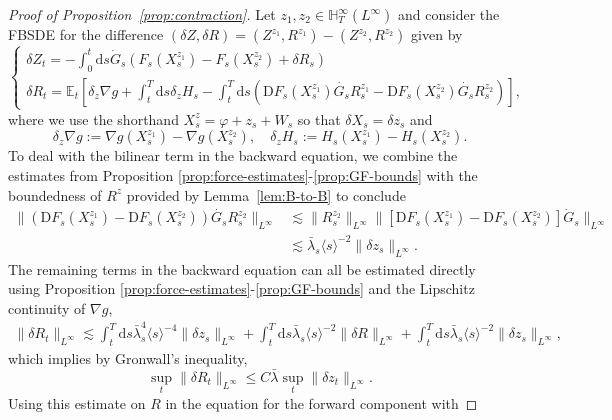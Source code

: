 \documentclass[11pt, a4paper]{scrartcl}
\numberwithin{equation}{section}
\theoremstyle{plain}
\theoremstyle{remark}
\newcommand{\assign}{:=}
\newcommand{\mathD}{\mathrm{D}}
\newcommand{\mathd}{\mathrm{d}}
\begin{document}
\begin{proof}[Proof of Proposition~\ref{prop:contraction}]
	Let $z_1, z_2 \in \mathbb{H}^{\infty}_T (L^{\infty})$ and consider the FBSDE
	for the difference $(\delta Z, \delta R) = (Z^{z_1}, R^{z_1}) - (Z^{z_2},
		R^{z_2})$ given by
	\begin{equation}
		\begin{cases}
			\delta Z_t = - \int_0^t \mathd s \dot{G}_s (F_s (X^{z_1}_s) - F_s
			(X^{z_2}_s) + \delta R_s) \\
			\delta R_t =\mathbb{E}_t \left[ \delta_z \nabla g + \int_t^T \mathd s
				\delta_z H_s - \int_t^T \mathd s (\mathD F_s (X^{z_1}_s) \dot{G_s}
				R^{z_1}_s - \mathD F_s (X^{z_2}_s) \dot{G_s} R^{z_2}_s) \right],
		\end{cases} \label{eq:FBSDE-spread}
	\end{equation}
	where we use the shorthand $X_s^z = \varphi + z_s + W_s$ so that $\delta X_s
		= \delta z_s$ and
	\[ \delta_z \nabla g \assign \nabla g (X^{z_1}_s) - \nabla g (X^{z_2}_s),
		\quad \delta_z H_s \assign H_s (X^{z_1}_s) - H_s (X^{z_2}_s) . \]
	To deal with the bilinear term in the backward equation, we combine the
	estimates from Proposition \ref{prop:force-estimates}-\ref{prop:GF-bounds}
	with the boundedness of $R^z$ provided by Lemma~\ref{lem:B-to-B} to conclude
	\begin{align*}
		\| (\mathD F_s (X^{z_1}_s) - \mathD F_s (X^{z_2}_s)) \dot{G_s} R^{z_2}_s
		\|_{L^{\infty}}
		 & \lesssim \| R^{z_2}_s \|_{L^{\infty}} \| [\mathD F_s
		(X^{z_1}_s) - \mathD F_s (X^{z_2}_s)]  \dot{G}_s \|_{L^{\infty}} \\
		 & \lesssim
		\bar{\lambda}_s \langle s \rangle^{- 2} \| \delta z_s \|_{L^{\infty}} .
	\end{align*}
	The remaining terms in the backward equation can all be estimated directly
	using Proposition \ref{prop:force-estimates}-\ref{prop:GF-bounds} and the
	Lipschitz continuity of $\nabla g$,
	\begin{align*}
		\| \delta R_t \|_{L^{\infty}}\lesssim \int_t^T \mathd s \bar{\lambda}_s^4 \langle s \rangle^{- 4} \|
		\delta z_s \|_{L^{\infty}} + \int_t^T \mathd s \bar{\lambda}_s \langle s
		\rangle^{- 2} \| \delta R \|_{L^{\infty}} + \int_t^T \mathd s \bar{\lambda}_s
		\langle s \rangle^{- 2} \| \delta z_s \|_{L^{\infty}},
	\end{align*}
	which implies by Gronwall's inequality,
	\[ \sup_t \| \delta R_t \|_{L^{\infty}} \leqslant C \bar{\lambda} \sup_t \| \delta
		z_t \|_{L^{\infty}} . \]
	Using this estimate on $R$ in the equation for the forward component with

\end{proof}
\end{document}
